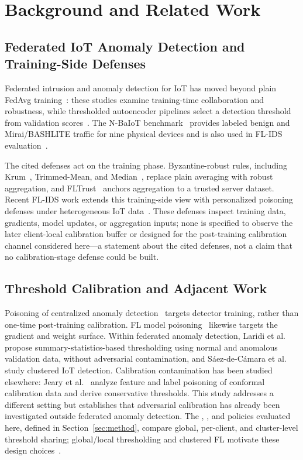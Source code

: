 \section{Background and Related Work}
\label{sec:background}

\subsection{Federated IoT Anomaly Detection and Training-Side Defenses}

Federated intrusion and anomaly detection for IoT has moved beyond plain FedAvg training~\cite{bunko2026ppflids,rey2022federated,Thein2024PFLIDS}: these studies examine training-time collaboration and robustness, while thresholded autoencoder pipelines select a detection threshold from validation scores~\cite{rey2022federated,saezdecamara2023}.
The N-BaIoT benchmark~\cite{meidan2018nbaiot} provides labeled benign and Mirai/BASHLITE traffic for nine physical devices and is also used in FL-IDS evaluation~\cite{rey2022federated}.

The cited defenses act on the training phase.
Byzantine-robust rules, including Krum~\cite{blanchard2017krum,feng2025security}, Trimmed-Mean, and Median~\cite{yin2018trimmed,kairouz2021advances}, replace plain averaging with robust aggregation, and FLTrust~\cite{cao2020fltrust} anchors aggregation to a trusted server dataset.
Recent FL-IDS work extends this training-side view with personalized poisoning defenses under heterogeneous IoT data~\cite{Thein2024PFLIDS}.
These defenses inspect training data, gradients, model updates, or aggregation inputs; none is specified to observe the later client-local calibration buffer or designed for the post-training calibration channel considered here---a statement about the cited defenses, not a claim that no calibration-stage defense could be built.

\subsection{Threshold Calibration and Adjacent Work}

Poisoning of centralized anomaly detection~\cite{rubinstein2009antidote} targets detector training, rather than one-time post-training calibration.
FL model poisoning~\cite{wan2024poisoning} likewise targets the gradient and weight surface.
Within federated anomaly detection, Laridi et al.~\cite{laridi2024} propose summary-statistics-based thresholding using normal and anomalous validation data, without adversarial contamination, and S\'aez-de-C\'amara et al.~\cite{saezdecamara2023} study clustered IoT detection. Calibration contamination has been studied elsewhere: Jeary et al.~\cite{jeary2026vrcp} analyze feature and label poisoning of conformal calibration data and derive conservative thresholds. This study addresses a different setting but establishes that adversarial calibration has already been investigated outside federated anomaly detection.
The \GLOBAL, \LOCAL, and \CLUSTER policies evaluated here, defined in Section~\ref{sec:method}, compare global, per-client, and cluster-level threshold sharing; global/local thresholding and clustered FL motivate these design choices~\cite{ghosh2022efficient,laridi2024,sattler2020clustered}.

